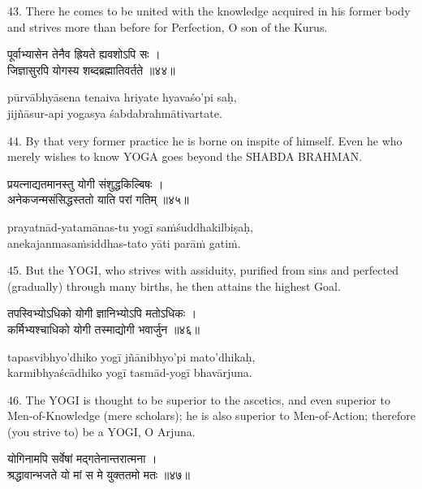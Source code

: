 43. There he comes to be united with the knowledge acquired in his former body
and strives more than before for Perfection, O son of the Kurus.

\begin{gitaverse}
पूर्वाभ्यासेन तेनैव ह्रियते ह्यवशोऽपि सः । \\
जिज्ञासुरपि योगस्य शब्दब्रह्मातिवर्तते ॥४४॥
\end{gitaverse}

\begin{transliteration}
pūrvābhyāsena tenaiva hriyate hyavaśo'pi saḥ, \\
jijñāsur-api yogasya śabdabrahmātivartate.
\end{transliteration}

44. By that very former practice he is borne on inspite of himself. Even he who
merely wishes to know YOGA goes beyond the SHABDA BRAHMAN.\@

\begin{gitaverse}
प्रयत्नाद्यतमानस्तु योगी संशुद्धकिल्बिषः । \\
अनेकजन्मसंसिद्धस्ततो याति परां गतिम् ॥४५॥
\end{gitaverse}

\begin{transliteration}
prayatnād-yatamānas-tu yogī saṁśuddhakilbiṣaḥ, \\
anekajanmasaṁsiddhas-tato yāti parāṁ gatiṁ.
\end{transliteration}

45. But the YOGI, who strives with assiduity, purified from sins and perfected
(gradually) through many births, he then attains the highest Goal.

\begin{gitaverse}
तपस्विभ्योऽधिको योगी ज्ञानिभ्योऽपि मतोऽधिकः । \\
कर्मिभ्यश्चाधिको योगी तस्माद्योगी भवार्जुन ॥४६॥
\end{gitaverse}

\begin{transliteration}
tapasvibhyo'dhiko yogī jñānibhyo'pi mato'dhikaḥ, \\
karmibhyaścādhiko yogī tasmād-yogī bhavārjuna.
\end{transliteration}

46. The YOGI is thought to be superior to the ascetics, and even superior to
Men-of-Knowledge (mere scholars); he is also superior to Men-of-Action;
therefore (you strive to) be a YOGI, O Arjuna.

\begin{gitaverse}
योगिनामपि सर्वेषां मद्गतेनान्तरात्मना । \\
श्रद्धावान्भजते यो मां स मे युक्ततमो मतः ॥४७॥
\end{gitaverse}

